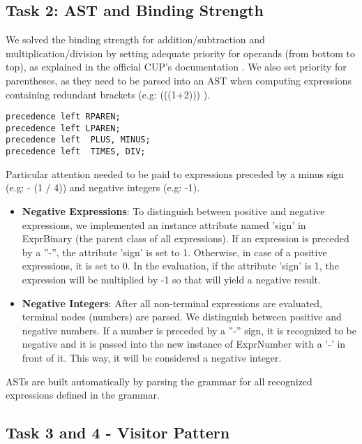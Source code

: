 \documentclass[paper=a4, fontsize=11pt]{scrartcl}
\numberwithin{equation}{section}		%
\numberwithin{figure}{section}			%
\numberwithin{table}{section}				%
\begin{document}
\subsection*{Task 2: AST and Binding Strength}
\label{Task2}
We solved the binding strength for addition/subtraction and multiplication/division by setting adequate priority for operands (from bottom to top), as explained in the official CUP's documentation \cite{key01}. We also set priority for parentheses, as they need to be parsed into an AST when computing expressions containing redundant brackets (e.g: (((1+2))) ).

\begin{lstlisting}
precedence left RPAREN;
precedence left LPAREN;
precedence left  PLUS, MINUS;
precedence left  TIMES, DIV;
\end{lstlisting}

Particular attention needed to be paid to expressions preceded by a minus sign (e.g: - (1 / 4)) and negative integers (e.g: -1).
\begin{itemize}
	\item \textbf{Negative Expressions}: To distinguish between positive and negative expressions, we implemented an instance attribute named 'sign' in ExprBinary (the parent class of all expressions).
If an expression is preceded by a ''-'', the attribute 'sign' is set to 1. Otherwise, in case of a positive expressions, it is set to 0. In the evaluation, if the attribute 'sign' is 1, the expression will be multiplied by -1 so that will yield a negative result.  
	\item \textbf{Negative Integers}: After all non-terminal expressions are evaluated, terminal nodes (numbers) are parsed. We distinguish between positive and negative numbers. If a number is preceded by a ''-'' sign, it is recognized to be negative and it is passed into the new instance of ExprNumber with a '-' in front of it. This way, it will be considered a negative integer.
\end{itemize}
ASTs are built automatically by parsing the grammar for all recognized expressions defined in the grammar.

\subsection*{Task 3 and 4 - Visitor Pattern}
\end{document}
